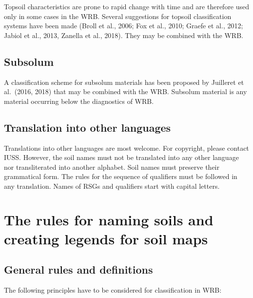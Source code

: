 \documentclass[
  letterpaper,
  DIV=11,
  numbers=noendperiod]{scrreprt}
\begin{document}
Topsoil characteristics are prone to rapid change with time and are
therefore used only in some cases in the WRB. Several suggestions for
topsoil classification systems have been made (Broll et al., 2006; Fox
et al., 2010; Graefe et al., 2012; Jabiol et al., 2013, Zanella et al.,
2018). They may be combined with the WRB.

\hypertarget{subsolum}{%
\section{Subsolum}\label{subsolum}}

A classification scheme for subsolum materials has been proposed by
Juilleret et al.~(2016, 2018) that may be combined with the WRB.
Subsolum material is any material occurring below the diagnostics of
WRB.

\hypertarget{translation-into-other-languages}{%
\section{Translation into other
languages}\label{translation-into-other-languages}}

Translations into other languages are most welcome. For copyright,
please contact IUSS. However, the soil names must not be translated into
any other language nor transliterated into another alphabet. Soil names
must preserve their grammatical form. The rules for the sequence of
qualifiers must be followed in any translation. Names of RSGs and
qualifiers start with capital letters.


\hypertarget{the-rules-for-naming-soils-and-creating-legends-for-soil-maps}{%
\chapter{The rules for naming soils and creating legends for soil
maps}\label{the-rules-for-naming-soils-and-creating-legends-for-soil-maps}}

\hypertarget{general-rules-and-definitions}{%
\section{General rules and
definitions}\label{general-rules-and-definitions}}

The following principles have to be considered for classification in
WRB:
\end{document}
